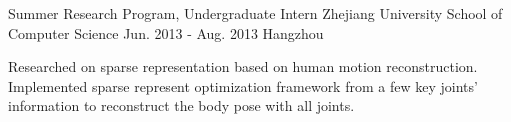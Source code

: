\begin{cventries}
  \cventry
    {Summer Research Program, Undergraduate Intern}
    {Zhejiang University \quad School of Computer Science}
    {Jun. 2013 - Aug. 2013}
    {Hangzhou}
    {
      \begin{cvitems}
        \item {Researched on sparse representation based on human motion reconstruction. Implemented sparse represent optimization framework from a few key joints’ information to reconstruct the body pose with all joints.}
      \end{cvitems}
    }
\end{cventries}
